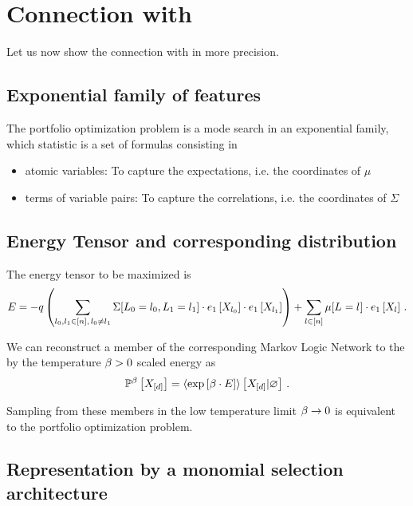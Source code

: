 \documentclass[aps,onecolumn,nofootinbib,pra]{article}
\begin{document}
\section{Connection with \tnreason}

Let us now show the connection with \tnreason in more precision.

\subsection{Exponential family of features}

The portfolio optimization problem is a mode search in an exponential family, which statistic is a set of formulas consisting in 
\begin{itemize}
	\item atomic variables: To capture the expectations, i.e. the coordinates of $\mu$
	\item terms of variable pairs: To capture the correlations, i.e. the coordinates of $\Sigma$
\end{itemize}

\subsection{Energy Tensor and corresponding distribution}

The energy tensor to be maximized is
	\[ E = - q \left(\sum_{l_{0},l_{1}\in[n] , \, l_{0}\neq l_{1}} 
	\Sigma[L_{0}=l_{0},L_{1}=l_{1}] \cdot e_{1}\left[X_{l_{0}}\right]\cdot e_{1}\left[X_{l_{1}}\right]\right) 
	+ \sum_{l\in[n]} \mu[L_{}=l_{}] \cdot e_{1}\left[X_{l}\right] \, . \]

We can reconstruct a member of the corresponding Markov Logic Network to the by the temperature $\beta>0$ scaled energy as
\begin{align*}
	\mathbb{P}^{\beta}\left[X_{[d]}\right] = \left\langle \mathrm{exp}\left[\beta\cdot E\right]\right\rangle \left[ X_{[d]} | \varnothing \right] \, . 
\end{align*}

Sampling from these members in the low temperature limit $\beta\rightarrow 0$ is equivalent to the portfolio optimization problem.

\subsection{Representation by a monomial selection architecture}
\end{document}
